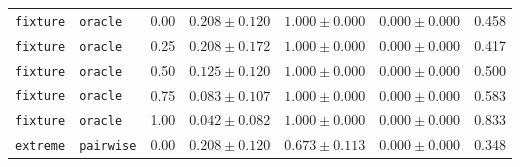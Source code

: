 \documentclass{article}
\begin{document}
\begin{center}
\begin{tabular}{lllcccc}
\texttt{fixture} & \texttt{oracle} & 0.00 & $0.208 \pm 0.120$ & $1.000 \pm 0.000$ & $0.000 \pm 0.000$ & 0.458 \\
\texttt{fixture} & \texttt{oracle} & 0.25 & $0.208 \pm 0.172$ & $1.000 \pm 0.000$ & $0.000 \pm 0.000$ & 0.417 \\
\texttt{fixture} & \texttt{oracle} & 0.50 & $0.125 \pm 0.120$ & $1.000 \pm 0.000$ & $0.000 \pm 0.000$ & 0.500 \\
\texttt{fixture} & \texttt{oracle} & 0.75 & $0.083 \pm 0.107$ & $1.000 \pm 0.000$ & $0.000 \pm 0.000$ & 0.583 \\
\texttt{fixture} & \texttt{oracle} & 1.00 & $0.042 \pm 0.082$ & $1.000 \pm 0.000$ & $0.000 \pm 0.000$ & 0.833 \\
\texttt{extreme} & \texttt{pairwise} & 0.00 & $0.208 \pm 0.120$ & $0.673 \pm 0.113$ & $0.000 \pm 0.000$ & 0.348 \\
\bottomrule
\end{tabular}
\end{center}
\end{document}
